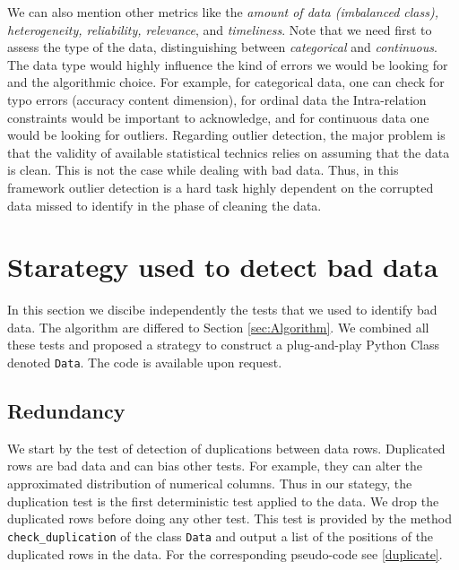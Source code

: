 \documentclass{article}
\begin{document}
We can also mention other metrics like the \textit{amount of data (imbalanced class), heterogeneity, reliability, relevance}, and \textit{timeliness}.
Note that we need first to assess the type of the data, distinguishing between \textit{categorical} and \textit{continuous}.
The data type would highly influence the kind of errors we would be looking for and the algorithmic choice.
For example, for categorical data, one can check for typo errors (accuracy content dimension), for ordinal data the Intra-relation constraints would be important to acknowledge, and for continuous data one would be looking for outliers.
Regarding outlier detection, the major problem is that the validity of available statistical technics relies on assuming that the data is clean.
This is not the case while dealing with bad data.
Thus, in this framework outlier detection is a hard task highly dependent on the corrupted data missed to identify in the phase of cleaning the data.
\section{Starategy used to detect bad data}
\label{sec:Starategy used to detect bad data}
In this section we discibe independently the tests that we used to identify bad data.
The algorithm are differed to Section \ref{sec:Algorithm}.
We combined all these tests and proposed a strategy to construct a plug-and-play Python Class denoted \texttt{Data}.
The code is available upon request.

\subsection{Redundancy} %
\label{sub:Duplication test}
We start by the test of detection of duplications between data rows.
Duplicated rows are bad data and can bias other tests.
For example, they can alter the approximated distribution of numerical columns.
Thus in our stategy, the duplication test is the first deterministic test applied to the data.
We drop the duplicated rows before doing any other test.
This test is provided by the method \texttt{check\_duplication} of the class \texttt{Data} and output a list of the positions of the duplicated rows in the data.
For the corresponding pseudo-code see  \ref{duplicate}.
\end{document}

